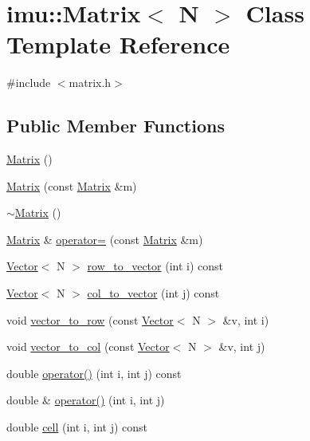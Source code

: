 \hypertarget{classimu_1_1Matrix}{}\section{imu\+:\+:Matrix$<$ N $>$ Class Template Reference}
\label{classimu_1_1Matrix}


{\ttfamily \#include $<$matrix.\+h$>$}

\subsection*{Public Member Functions}
\begin{DoxyCompactItemize}
\item 
\hyperlink{classimu_1_1Matrix_a5b649193b96374840dc3530e91f0bec0}{Matrix} ()
\item 
\hyperlink{classimu_1_1Matrix_aea80f956257e689fb022c168d100525c}{Matrix} (const \hyperlink{classimu_1_1Matrix}{Matrix} \&m)
\item 
\hyperlink{classimu_1_1Matrix_a1834e4aa47ea76f7fdfeb3bd16f1e9a9}{$\sim$\+Matrix} ()
\item 
\hyperlink{classimu_1_1Matrix}{Matrix} \& \hyperlink{classimu_1_1Matrix_acbc2e0a21a8106f8e28002a73c9dc5ed}{operator=} (const \hyperlink{classimu_1_1Matrix}{Matrix} \&m)
\item 
\hyperlink{classimu_1_1Vector}{Vector}$<$ N $>$ \hyperlink{classimu_1_1Matrix_aac05eaf563a894229c0ebacec7d2f659}{row\+\_\+to\+\_\+vector} (int i) const 
\item 
\hyperlink{classimu_1_1Vector}{Vector}$<$ N $>$ \hyperlink{classimu_1_1Matrix_a6dccc34f3d6d830398637a87557a8331}{col\+\_\+to\+\_\+vector} (int j) const 
\item 
void \hyperlink{classimu_1_1Matrix_a51e6e291b74346c646de155669cfd5d0}{vector\+\_\+to\+\_\+row} (const \hyperlink{classimu_1_1Vector}{Vector}$<$ N $>$ \&v, int i)
\item 
void \hyperlink{classimu_1_1Matrix_a63a6b95f49c96e547815608f66e7d694}{vector\+\_\+to\+\_\+col} (const \hyperlink{classimu_1_1Vector}{Vector}$<$ N $>$ \&v, int j)
\item 
double \hyperlink{classimu_1_1Matrix_ac3d96b8d6c731dca601ac57e883215cf}{operator()} (int i, int j) const 
\item 
double \& \hyperlink{classimu_1_1Matrix_a0167d4b04dcc4e88f6604a51bbbb20e2}{operator()} (int i, int j)
\item 
double \hyperlink{classimu_1_1Matrix_a9f22094377ec58e22d61ea9c979bf9d2}{cell} (int i, int j) const 

\end{DoxyCompactItemize}

